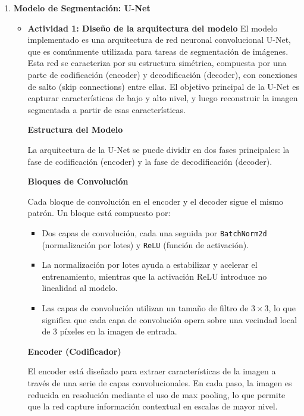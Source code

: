 \begin{enumerate}
  \item \textbf{Modelo de Segmentación: U-Net}
  \begin{itemize}
  \item\textbf{Actividad 1: Diseño de la arquitectura del modelo}
  El modelo implementado es una arquitectura de red neuronal convolucional U-Net, que es comúnmente utilizada para tareas de segmentación de imágenes. Esta red se caracteriza por su estructura simétrica, compuesta por una parte de codificación (encoder) y decodificación (decoder), con conexiones de salto (skip connections) entre ellas. El objetivo principal de la U-Net es capturar características de bajo y alto nivel, y luego reconstruir la imagen segmentada a partir de esas características.

\textbf{Estructura del Modelo}

La arquitectura de la U-Net se puede dividir en dos fases principales: la fase de codificación (encoder) y la fase de decodificación (decoder).

\textbf{Bloques de Convolución}

Cada bloque de convolución en el encoder y el decoder sigue el mismo patrón. Un bloque está compuesto por:
\begin{itemize}
    \item Dos capas de convolución, cada una seguida por \texttt{BatchNorm2d} (normalización por lotes) y \texttt{ReLU} (función de activación).
    \item La normalización por lotes ayuda a estabilizar y acelerar el entrenamiento, mientras que la activación ReLU introduce no linealidad al modelo.
    \item Las capas de convolución utilizan un tamaño de filtro de $3 \times 3$, lo que significa que cada capa de convolución opera sobre una vecindad local de 3 píxeles en la imagen de entrada.
\end{itemize}

\textbf{Encoder (Codificador)}

El encoder está diseñado para extraer características de la imagen a través de una serie de capas convolucionales. En cada paso, la imagen es reducida en resolución mediante el uso de max pooling, lo que permite que la red capture información contextual en escalas de mayor nivel.


\end{itemize}
\end{enumerate}
